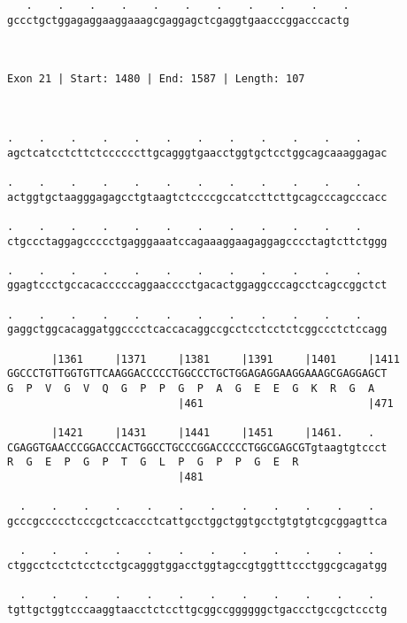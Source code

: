 \documentclass{article}
\begin{document}
\begin{Verbatim}
   .    .    .    .    .    .    .    .    .    .    .
gccctgctggagaggaaggaaagcgaggagctcgaggtgaacccggacccactg
                                                      
                                                      
 
Exon 21 | Start: 1480 | End: 1587 | Length: 107



.    .    .    .    .    .    .    .    .    .    .    .    
agctcatcctcttctccccccttgcagggtgaacctggtgctcctggcagcaaaggagac
                                                            
.    .    .    .    .    .    .    .    .    .    .    .    
actggtgctaagggagagcctgtaagtctccccgccatccttcttgcagcccagcccacc
                                                            
.    .    .    .    .    .    .    .    .    .    .    .    
ctgccctaggagccccctgagggaaatccagaaaggaagaggagcccctagtcttctggg
                                                            
.    .    .    .    .    .    .    .    .    .    .    .    
ggagtccctgccacacccccaggaacccctgacactggaggcccagcctcagccggctct
                                                            
.    .    .    .    .    .    .    .    .    .    .    .    
gaggctggcacaggatggcccctcaccacaggccgcctcctcctctcggccctctccagg
                                                            
       |1361     |1371     |1381     |1391     |1401     |1411
GGCCCTGTTGGTGTTCAAGGACCCCCTGGCCCTGCTGGAGAGGAAGGAAAGCGAGGAGCT
G  P  V  G  V  Q  G  P  P  G  P  A  G  E  E  G  K  R  G  A  
                           |461                          |471
  
       |1421     |1431     |1441     |1451     |1461.    .  
CGAGGTGAACCCGGACCCACTGGCCTGCCCGGACCCCCTGGCGAGCGTgtaagtgtccct
R  G  E  P  G  P  T  G  L  P  G  P  P  G  E  R              
                           |481                             
  
  .    .    .    .    .    .    .    .    .    .    .    .  
gcccgccccctcccgctccaccctcattgcctggctggtgcctgtgtgtcgcggagttca
                                                            
  .    .    .    .    .    .    .    .    .    .    .    .  
ctggcctcctctcctcctgcagggtggacctggtagccgtggtttccctggcgcagatgg
                                                            
  .    .    .    .    .    .    .    .    .    .    .    .  
tgttgctggtcccaaggtaacctctccttgcggccggggggctgaccctgccgctccctg
                                                            

\end{Verbatim}
\end{document}
